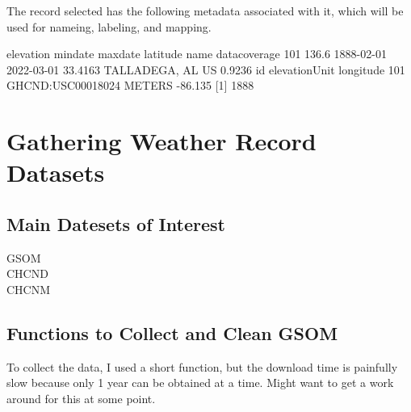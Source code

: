 \documentclass{article}\usepackage[]{graphicx}\usepackage[]{color}
\begin{document}
The record selected has the following metadata associated with it, which will be used for nameing, labeling, and mapping. 

    elevation    mindate    maxdate latitude             name datacoverage
101     136.6 1888-02-01 2022-03-01  33.4163 TALLADEGA, AL US       0.9236
                   id elevationUnit longitude
101 GHCND:USC00018024        METERS   -86.135
[1] 1888


\section{Gathering Weather Record Datasets}

\subsection{Main Datesets of Interest}

\begin{description}
  \item[GSOM]
  \item[CHCND]
  \item[CHCNM]
\end{description}

\subsection{Functions to Collect and Clean GSOM}

To collect the data, I used a short function, but the download time is painfully slow because only 1 year can be obtained at a time. Might want to get a work around for this at some point. 
\end{document}
